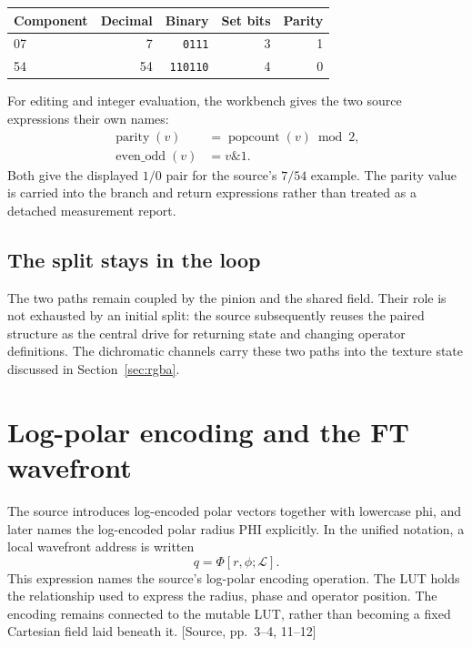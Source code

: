 \documentclass[11pt,a4paper]{article}
\newcommand{\src}[1]{{\sffamily\footnotesize\color{DWGray}[Source, pp.~#1]}}
\newcommand{\code}[1]{\texttt{#1}}
\newcommand{\LUT}{\mathcal{L}}
\begin{document}
\begin{center}
\begin{tabular}{@{}lrrrr@{}}
\toprule
\textbf{Component} & \textbf{Decimal} & \textbf{Binary} & \textbf{Set bits} & \textbf{Parity}\\
\midrule
07 & 7 & \code{0111} & 3 & 1\\
54 & 54 & \code{110110} & 4 & 0\\
\bottomrule
\end{tabular}
\end{center}

For editing and integer evaluation, the workbench gives the two source expressions their own names:
\begin{align}
\operatorname{parity}(v)&=\operatorname{popcount}(v)\bmod 2,\\
\operatorname{even\_odd}(v)&=v\mathbin{\&}1.
\end{align}
Both give the displayed $1/0$ pair for the source's $7/54$ example. The parity value is carried into the branch and return expressions rather than treated as a detached measurement report.

\subsection{The split stays in the loop}
The two paths remain coupled by the pinion and the shared field. Their role is not exhausted by an initial split: the source subsequently reuses the paired structure as the central drive for returning state and changing operator definitions. The dichromatic channels carry these two paths into the texture state discussed in Section~\ref{sec:rgba}.
\clearpage

\section{Log-polar encoding and the FT wavefront}
The source introduces log-encoded polar vectors together with lowercase phi, and later names the log-encoded polar radius PHI explicitly. In the unified notation, a local wavefront address is written
\begin{equation}
q=\Phi[r,\phi;\LUT].
\end{equation}
This expression names the source's log-polar encoding operation. The LUT holds the relationship used to express the radius, phase and operator position. The encoding remains connected to the mutable LUT, rather than becoming a fixed Cartesian field laid beneath it. \src{3--4, 11--12}
\end{document}

